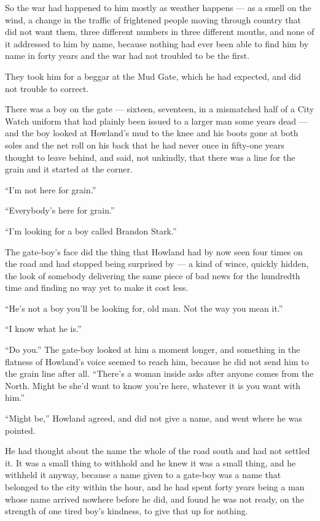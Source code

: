 So the war had happened to him mostly as weather happens — as a smell on the wind, a change in the traffic of frightened people moving through country that did not want them, three different numbers in three different mouths, and none of it addressed to him by name, because nothing had ever been able to find him by name in forty years and the war had not troubled to be the first.

\sceneBreak

They took him for a beggar at the Mud Gate, which he had expected, and did not trouble to correct.

There was a boy on the gate — sixteen, seventeen, in a mismatched half of a City Watch uniform that had plainly been issued to a larger man some years dead — and the boy looked at Howland’s mud to the knee and his boots gone at both soles and the net roll on his back that he had never once in fifty-one years thought to leave behind, and said, not unkindly, that there was a line for the grain and it started at the corner.

“I’m not here for grain.”

“Everybody’s here for grain.”

“I’m looking for a boy called Brandon Stark.”

The gate-boy’s face did the thing that Howland had by now seen four times on the road and had stopped being surprised by — a kind of wince, quickly hidden, the look of somebody delivering the same piece of bad news for the hundredth time and finding no way yet to make it cost less.

“He’s not a boy you’ll be looking for, old man. Not the way you mean it.”

“I know what he is.”

“Do you.” The gate-boy looked at him a moment longer, and something in the flatness of Howland’s voice seemed to reach him, because he did not send him to the grain line after all. “There’s a woman inside asks after anyone comes from the North. Might be she’d want to know you’re here, whatever it is you want with him.”

“Might be,” Howland agreed, and did not give a name, and went where he was pointed.

He had thought about the name the whole of the road south and had not settled it. It was a small thing to withhold and he knew it was a small thing, and he withheld it anyway, because a name given to a gate-boy was a name that belonged to the city within the hour, and he had spent forty years being a man whose name arrived nowhere before he did, and found he was not ready, on the strength of one tired boy’s kindness, to give that up for nothing.

